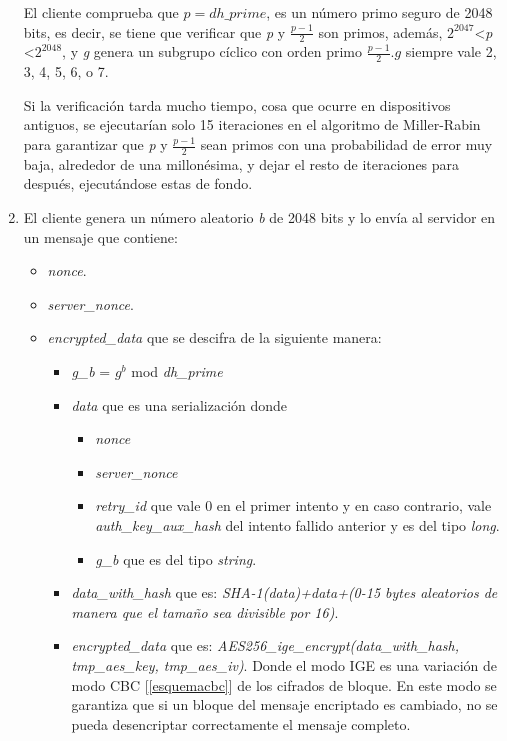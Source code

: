 \begin{enumerate}
	El cliente comprueba que $p=dh\_prime$, es un número primo seguro de 2048 bits, es decir, se tiene que verificar que \emph{p} y $\frac{p-1}{2}$ son primos, además, $2^{2047}$\textless \emph{p} \textless $2^{2048}$, y \emph{g} genera un subgrupo cíclico con orden primo $\frac{p-1}{2}$.$g$ siempre vale 2, 3, 4, 5, 6, o 7.

	Si la verificación tarda mucho tiempo, cosa que ocurre en dispositivos antiguos, se ejecutarían solo 15 iteraciones en el algoritmo de Miller-Rabin para garantizar que \emph{p} y $\frac{p-1}{2}$ sean primos con una probabilidad de error muy baja, alrededor de una millonésima, y dejar el resto de iteraciones para después, ejecutándose estas de fondo.

	\item El cliente genera un número aleatorio \emph{b} de 2048 bits y lo envía al servidor en un mensaje que contiene:
		\begin{itemize}
			\item \emph{nonce}.
			\item \emph{server\_nonce}.
			\item \emph{encrypted\_data} que se descifra de la siguiente manera:
				\begin{itemize}
					\item \emph{g\_b} = $g^b$ mod \emph{dh\_prime}
					\item \emph{data} que es una serialización donde
						\begin{itemize}
							\item \emph{nonce}
							\item \emph{server\_nonce}
							\item \emph{retry\_id} que vale 0 en el primer intento y en caso contrario, vale \emph{auth\_key\_aux\_hash} del intento fallido anterior y es del tipo \emph{long}.
							\item \emph{g\_b} que es del tipo \emph{string}.
						\end{itemize}
					\item \emph{data\_with\_hash} que es: \emph{SHA-1(data)+data+(0-15 bytes aleatorios de manera que el tamaño sea divisible por 16)}.
					\item \emph{encrypted\_data} que es: \emph{AES256\_ige\_encrypt(data\_with\_hash, tmp\_aes\_key, tmp\_aes\_iv)}. Donde el modo IGE es una variación de modo CBC [\ref{esquemacbc}] de los cifrados de bloque. En este modo se garantiza que si un bloque del mensaje encriptado es cambiado, no se pueda desencriptar correctamente el mensaje completo.

\end{itemize}
\end{itemize}
\end{enumerate}

